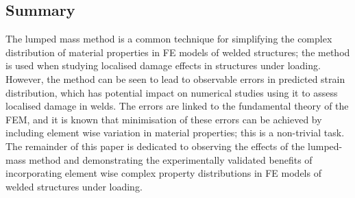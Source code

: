 \subsection{Summary}
\label{Intro:Summary}
The lumped mass method is a common technique for simplifying the complex distribution of material properties in FE models of welded structures; the method is used when studying localised damage effects in structures under loading. However, the method can be seen to lead to observable errors in predicted strain distribution, which has potential impact on numerical studies using it to assess localised damage in welds. The errors are linked to the fundamental theory of the FEM, and it is known that minimisation of these errors can be achieved by including element wise variation in material properties; this is a non-trivial task. The remainder of this paper is dedicated to observing the effects of the lumped-mass method and demonstrating the experimentally validated benefits of incorporating element wise complex property distributions in FE models of welded structures under loading.



